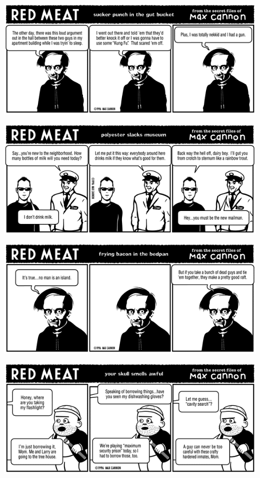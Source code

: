 \documentclass[a4paper,twoside,11pt]{article}
\begin{document}
\includegraphics[width=\textwidth]{redmeat_1996-09-30.png}



\includegraphics[width=\textwidth]{redmeat_1996-10-07.png}



\includegraphics[width=\textwidth]{redmeat_1996-10-14.png}



\includegraphics[width=\textwidth]{redmeat_1996-10-21.png}
\end{document}
